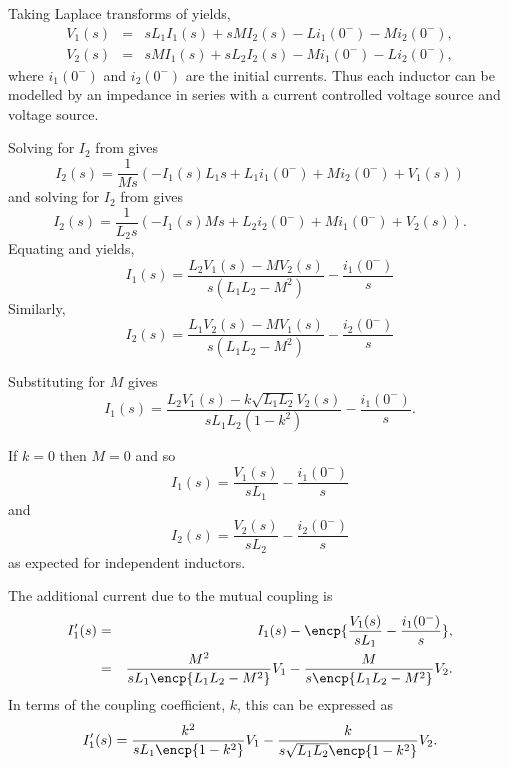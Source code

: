 \documentclass[a4paper, 12pt]{article}
\begin{document}
Taking Laplace transforms of  yields,
%
\begin{eqnarray}
\label{eqn:mut_V1}
 V_1(s) & = & s L_1 I_1(s) + s M I_2(s) - L i_1(0^{-}) - M i_2(0^{-}), \\
 V_2(s) & = & s M I_1(s) + s L_2 I_2(s) - M i_1(0^{-}) - L i_2(0^{-}),
\label{eqn:mut_V2}
\end{eqnarray}
%
where $i_1(0^{-})$ and $i_2(0^{-})$ are the initial currents.
Thus each inductor can be modelled by an impedance in series with a
current controlled voltage source and voltage source.

Solving for $I_2$ from  gives
%
\begin{equation} 
  I_2(s) = \frac{1}{M s} \left(- I_1(s) L_1 s + L_1 i_1(0^{-}) + M i_2(0^{-}) + V_1(s)\right)
\label{eqn:mut_I2V1}
\end{equation}
%
and solving for $I_2$ from  gives
%
\begin{equation}
I_2(s) = \frac{1}{L_2 s} \left(- I_1(s) M s + L_2 i_2(0^{-}) + M i_1(0^{-}) + V_2(s)\right).
\label{eqn:mut_I2V2}
\end{equation}
%
Equating  and  yields,
%
\begin{equation}
I_1(s) =\frac{L_2 V_1(s) - M V_2(s)}{s \left(L_1 L_2 - M^{2}\right)}
- \frac{i_1(0^{-})}{s}
 \end{equation}
%
Similarly,
%
\begin{equation}
I_2(s) =\frac{L_1 V_2(s) - M V_1(s)}{s \left(L_1 L_2 - M^{2}\right)}
- \frac{i_2(0^{-})}{s}
 \end{equation}


Substituting for $M$ gives
%
\begin{equation}
I_1(s) =\frac{L_2 V_1(s) - k\sqrt{L_1 L_2} V_2(s)}{s L_1 L_2 \left(1 - k^2\right)}
- \frac{i_1(0^{-})}{s}.
 \end{equation}



If $k=0$ then $M=0$ and so
%
\begin{equation}
I_1(s) = \frac{V_1(s)}{s L_1} - \frac{i_1(0^{-})}{s}
 \end{equation}
%
and
%
\begin{equation}
I_2(s) = \frac{V_2(s)}{s L_2} - \frac{i_2(0^{-})}{s}
\end{equation}
%
as expected for independent inductors.


The additional current due to the mutual coupling is
%
\begin{eqnarray}
  I_1'(s) & = & I_1(s) - \encp{\frac{V_1(s)}{s L_1} - \frac{i_1(0^{-})}{s}}, \\
          & = & \frac{M^2}{s L_1 \encp{L_1 L_2 - M^2}} V_1 - \frac{M}{s \encp{L_1 L_2 - M^2}} V_2.
\end{eqnarray}
%
In terms of the coupling coefficient, $k$, this can be expressed as
%
\begin{equation}
  I_1'(s) = \frac{k^2}{s L_1 \encp{1-k^2}} V_1 - \frac{k}{s\sqrt{L_1 L_2}\encp{1-k^2}}V_2.
\end{equation}
\end{document}
